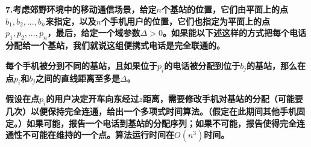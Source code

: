 
\chapter{}
\textbf{
7.考虑郊野环境中的移动通信场景，给定$n$个基站的位置，它们由平面上的点$b_1,b_2,...,b_n$来指定，以及$n$个手机用户的位置，它们也指定为平面上的点$p_1,p_2,...,p_n$，最后，给定一个域参数$\Delta>0$。如果能以下述这样的方式把每个电话分配给一个基站，我们就说这组便携式电话是完全联通的。
}

\textbf{每个手机被分到不同的基站，且如果位于$p_i$的电话被分配到位于$b_j$的基站，那么在点$p_i$和$b_j$之间的直线距离至多是$\Delta$。}

\textbf{假设在点$p_i$的用户决定开车向东经过$z$距离，需要修改手机对基站的分配（可能要几次）以便保持完全连通，给出一个多项式时间算法。（假定在此期间其他手机固定。）如果可能，报告一个电话到基站的分配序列；如果不可能，报告使得完全连通性不可能在维持的一个点。算法运行时间在$O(n^3)$时间。}


